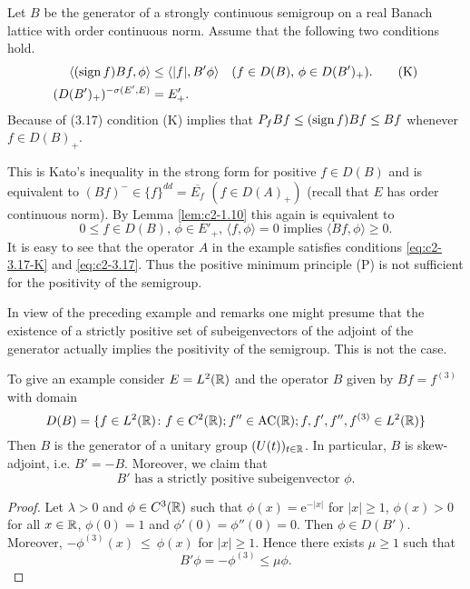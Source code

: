 \begin{remark}\label{rem:c2-3.16}
Let $B$ be the generator of a strongly continuous semigroup on a real Banach lattice with order continuous norm. Assume that the following two conditions hold.
\begin{align}
\langle(\operatorname{sign}  f)Bf,\phi\rangle &\leq \langle|f|,B'\phi\rangle \quad (f \in D(B), \, \phi \in D(B')_{+}). \label{eq:c2-3.17-K} \tag{K}\\
(D(B')_{+})^{-\sigma(E',E)} &= E'_{+}. \label{eq:c2-3.17}
\end{align}
Because of (3.17) condition (K) implies that $P_{f}Bf \leq (\operatorname{sign}  f)Bf \leq Bf$
whenever $f \in D(B)_{+}$.

This is Kato's inequality in the strong form for positive $f \in D(B)$ and is equivalent to $(Bf)^{-} \in \{f\}^{dd} = \overline{E_f}$ $(f \in D(A)_{+})$ 
(recall that $E$ has order continuous norm). By Lemma 
\ref{lem:c2-1.10}  this again is equivalent to
\begin{equation}\label{eq:c2-P2} \tag{P}
0 \leq f \in D(B), \, \phi \in E'_{+}, \, \langle f,\phi \rangle = 0 \text{ implies } \langle Bf,\phi \rangle \geq 0.
\end{equation}
It is easy to see that the operator $A$ in the example satisfies conditions \eqref{eq:c2-3.17-K}  and \eqref{eq:c2-3.17}. Thus the positive minimum principle (P) is not sufficient for the positivity of the semigroup.
\end{remark}
In view of the preceding example and remarks one might presume that the existence of a strictly positive set of subeigenvectors of the adjoint of the generator actually implies the positivity of the semigroup. 
This is not the case.

To give an example consider $E = L^{2}(\mathbb{R})$ and the operator $B$ given by 
$Bf = f^{(3)}$ with domain
\[
D(B) = \{f \in L^{2}(\mathbb{R}) \colon f \in C^{2}(\mathbb{R}); f'' \in \text{AC}(\mathbb{R}) ; f,f',f'',f^{(3)} \in L^{2}(\mathbb{R})\}
\]
Then $B$ is the generator of a unitary group $(U(t))_{t \in \mathbb{R}}$. 
In particular, $B$ is skew-adjoint, i.e. $B' = -B$.
Moreover, we claim that
\begin{equation}\label{eq:c2-3.18}
B' \text{ has a strictly positive subeigenvector } \phi.
\end{equation}
\begin{proof}
Let $\lambda > 0$ and $\phi \in C^{3}(\mathbb{R})$ such that $\phi(x) = \mathrm{e}^{-|x|}$ for
$|x| \geq 1$, $\phi(x) > 0$ for all $x \in \mathbb{R}$, $\phi(0) = 1$ and $\phi'(0) = \phi''(0) = 0$.
Then $\phi \in D(B')$. 
Moreover, $-\phi^{(3)}(x)~\leq~\phi(x)$ for $|x| \geq 1$. 
Hence there exists $\mu \geq 1$ such that
%
\[
	B'\phi = -\phi^{(3)} \leq \mu\phi .
\]
%
\phantom{x}
\end{proof}


